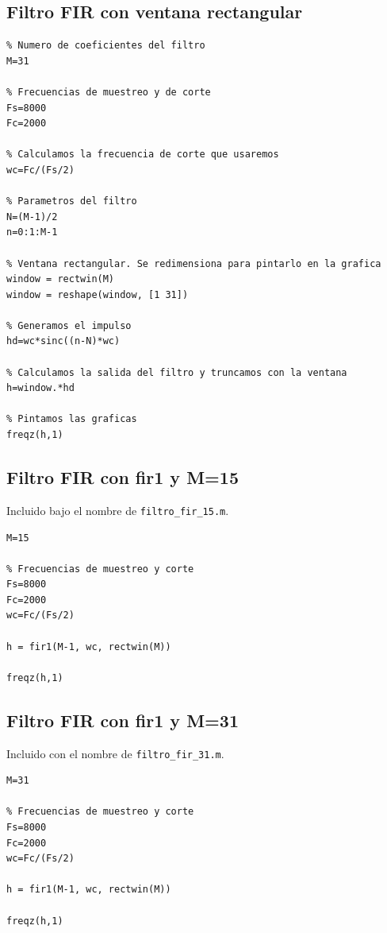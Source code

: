 \documentclass[11pt,a4paper]{article}
\begin{document}
\subsection{Filtro FIR con ventana rectangular}
\label{code1}

\begin{lstlisting}[frame=single]
% Se definen los parametros
% Numero de coeficientes del filtro
M=31

% Frecuencias de muestreo y de corte
Fs=8000
Fc=2000

% Calculamos la frecuencia de corte que usaremos
wc=Fc/(Fs/2)

% Parametros del filtro
N=(M-1)/2
n=0:1:M-1

% Ventana rectangular. Se redimensiona para pintarlo en la grafica
window = rectwin(M)
window = reshape(window, [1 31])

% Generamos el impulso
hd=wc*sinc((n-N)*wc)

% Calculamos la salida del filtro y truncamos con la ventana
h=window.*hd

% Pintamos las graficas
freqz(h,1)
\end{lstlisting}

\subsection{Filtro FIR con fir1 y M=15}
\label{code2}

Incluido bajo el nombre de \texttt{filtro\_fir\_15.m}.

\begin{lstlisting}[frame=single]
% Coeficientes del filtro
M=15

% Frecuencias de muestreo y corte
Fs=8000
Fc=2000
wc=Fc/(Fs/2)

h = fir1(M-1, wc, rectwin(M))

freqz(h,1)
\end{lstlisting}

\subsection{Filtro FIR con fir1 y M=31}
\label{code3}

Incluido con el nombre de \texttt{filtro\_fir\_31.m}.

\begin{lstlisting}[frame=single]
% Coeficientes del filtro
M=31

% Frecuencias de muestreo y corte
Fs=8000
Fc=2000
wc=Fc/(Fs/2)

h = fir1(M-1, wc, rectwin(M))

freqz(h,1)
\end{lstlisting}
\end{document}
